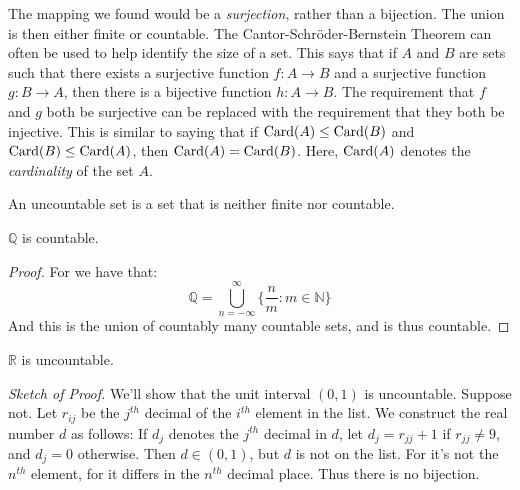             The mapping we found would be a
            \textit{surjection}, rather than a bijection.
            The union is then either finite or countable. The
            Cantor-Schr\"{o}der-Bernstein Theorem can often be
            used to help identify the size of a set. This says
            that if $A$ and $B$ are sets such that there exists
            a surjective function $f:A\rightarrow{B}$ and a
            surjective function $g:B\rightarrow{A}$, then there
            is a bijective function $h:A\rightarrow{B}$. The
            requirement that $f$ and $g$ both be surjective
            can be replaced with the requirement that they both
            be injective. This is similar to saying that if
            $\operatorname{Card}(A)\leq\operatorname{Card}(B)$ and $\operatorname{Card}(B)\leq\operatorname{Card}(A)$,
            then $\operatorname{Card}(A)=\operatorname{Card}(B)$. Here, $\operatorname{Card}(A)$ denotes
            the \textit{cardinality} of the set $A$.
            \begin{definition}
                An uncountable set is a set that is
                neither finite nor countable.
            \end{definition}
            \begin{theorem}
                $\mathbb{Q}$ is countable.
            \end{theorem}
            \begin{proof}
                For we have that:
                \begin{equation}
                    \mathbb{Q}=
                    \bigcup_{n=-\infty}^{\infty}
                    \Big\{\frac{n}{m}:m\in\mathbb{N}\Big\}
                \end{equation}
                And this is the union of countably
                many countable sets, and is thus countable.
            \end{proof}
            \begin{theorem}
                $\mathbb{R}$ is uncountable.
            \end{theorem}
            \textit{Sketch of Proof.} We'll show that the unit
            interval $(0,1)$ is uncountable. Suppose not.
            Let $r_{ij}$ be the $j^{th}$ decimal of the $i^{th}$
            element in the list. We construct the real number
            $d$ as follows: If $d_{j}$ denotes the $j^{th}$
            decimal in $d$, let $d_{j}=r_{jj}+1$ if
            $r_{jj}\ne{9}$, and $d_{j}=0$ otherwise. Then
            $d\in(0,1)$, but $d$ is not on the list. For it's not
            the $n^{th}$ element, for it differs in the
            $n^{th}$ decimal place. Thus there is no bijection.
